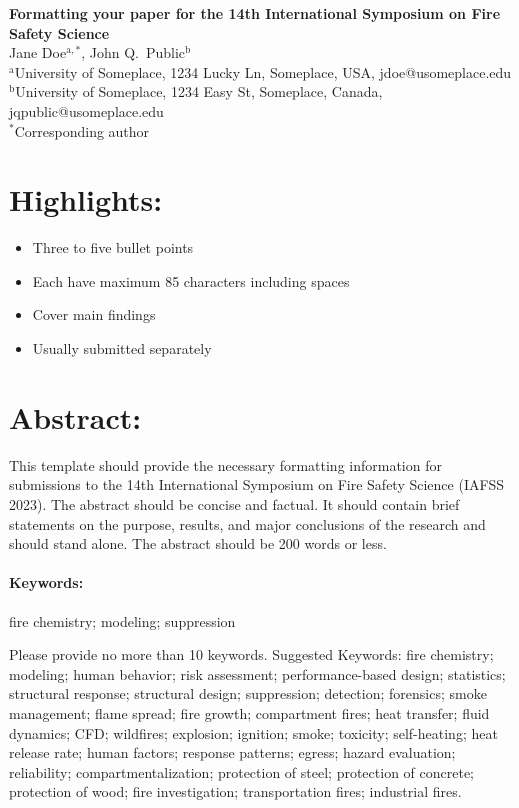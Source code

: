 \documentclass[fleqn,letterpaper,12pt]{article}
\begin{document}
\linenumbers

\begin{flushleft}
\textbf{Formatting your paper for the 14th International Symposium on Fire Safety Science}\\
\vspace{8pt}
Jane Doe$^{\mathrm{a},*}$, John Q.~Public$^\mathrm{b}$\\
\vspace{8pt}
$^\mathrm{a}$University of Someplace, 1234 Lucky Ln, Someplace, USA, jdoe@usomeplace.edu \\
\vspace{8pt}
$^\mathrm{b}$University of Someplace, 1234 Easy St, Someplace, Canada, jqpublic@usomeplace.edu \\
\vspace{8pt}
$^*$Corresponding author
\end{flushleft}
\rm

\section*{Highlights:}

\begin{itemize}
\item Three to five bullet points
\item Each have maximum 85 characters including spaces
\item Cover main findings
\item Usually submitted separately
\end{itemize}

\section*{Abstract:}

This template should provide the necessary formatting information for submissions to the 14th International Symposium on Fire Safety Science (IAFSS 2023).  The abstract should be concise and factual.  It should contain brief statements on the purpose, results, and major conclusions of the research and should stand alone.  The abstract should be 200 words or less.

\paragraph*{Keywords:} fire chemistry; modeling; suppression

Please provide no more than 10 keywords.  Suggested Keywords: fire chemistry; modeling; human behavior; risk assessment; performance-based design; statistics; structural response; structural design; suppression; detection; forensics; smoke management; flame spread; fire growth; compartment fires; heat transfer; fluid dynamics; CFD; wildfires; explosion; ignition; smoke; toxicity; self-heating; heat release rate; human factors; response patterns; egress; hazard evaluation; reliability; compartmentalization; protection of steel; protection of concrete; protection of wood; fire investigation; transportation fires; industrial fires.
\end{document}
